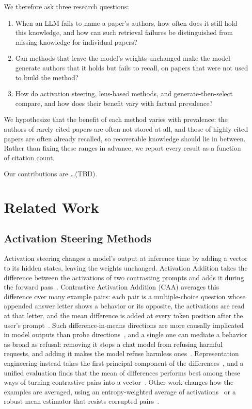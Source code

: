 \documentclass[sigconf,nonacm]{acmart}
\begin{document}
We therefore ask three research questions:
\begin{enumerate}
  \item[\textbf{RQ1.}] When an LLM fails to name a paper's authors, how often does it still hold this knowledge, and how can such retrieval failures be distinguished from missing knowledge for individual papers?
  \item[\textbf{RQ2.}] Can methods that leave the model's weights unchanged make the model generate authors that it holds but fails to recall, on papers that were not used to build the method?
  \item[\textbf{RQ3.}] How do activation steering, lens-based methods, and generate-then-select compare, and how does their benefit vary with factual prevalence?
\end{enumerate}
We hypothesize that the benefit of each method varies with prevalence: the authors of rarely cited papers are often not stored at all, and those of highly cited papers are often already recalled, so recoverable knowledge should lie in between. Rather than fixing these ranges in advance, we report every result as a function of citation count.

Our contributions are \ldots (TBD).

\section{Related Work}

\subsection{Activation Steering Methods}
Activation steering changes a model's output at inference time by adding a vector to its hidden states, leaving the weights unchanged. Activation Addition takes the difference between the activations of two contrasting prompts and adds it during the forward pass~\cite{turner2023actadd}. Contrastive Activation Addition (CAA) averages this difference over many example pairs: each pair is a multiple-choice question whose appended answer letter shows a behavior or its opposite, the activations are read at that letter, and the mean difference is added at every token position after the user's prompt~\cite{rimsky2024caa}. Such difference-in-means directions are more causally implicated in model outputs than probe directions~\cite{marks2024geometry}, and a single one can mediate a behavior as broad as refusal: removing it stops a chat model from refusing harmful requests, and adding it makes the model refuse harmless ones~\cite{arditi2024refusal}. Representation engineering instead takes the first principal component of the differences~\cite{zou2023repe}, and a unified evaluation finds that the mean of differences performs best among these ways of turning contrastive pairs into a vector~\cite{im2025unified}. Other work changes how the examples are averaged, using an entropy-weighted average of activations~\cite{rahn2024east} or a robust mean estimator that resists corrupted pairs~\cite{anderson2026corruption}.
\end{document}

